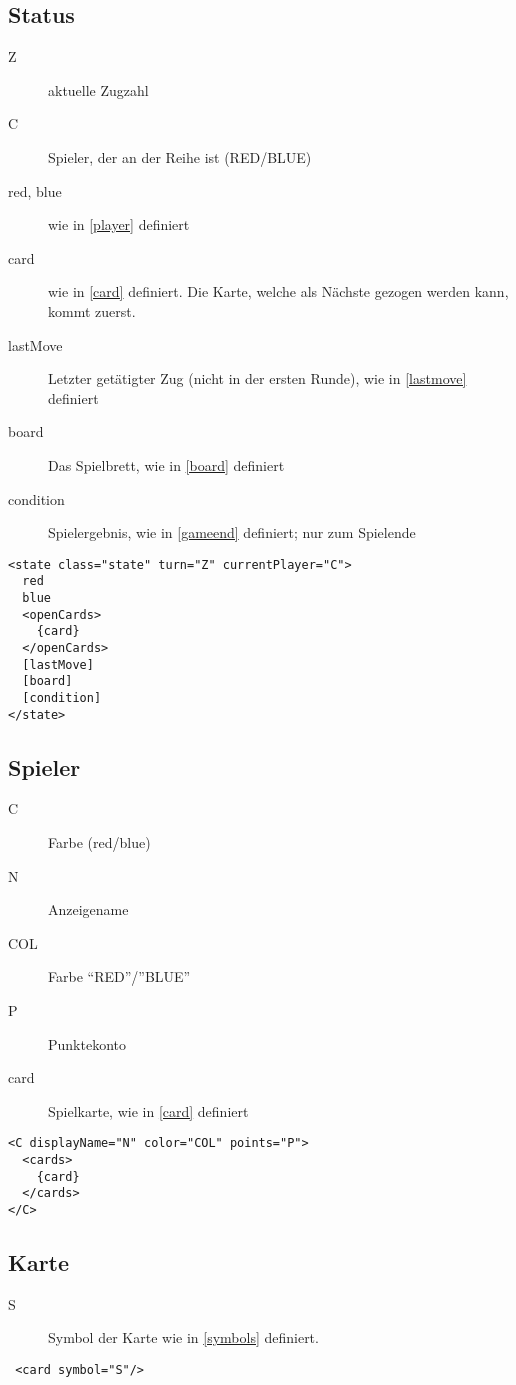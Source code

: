 \documentclass[12pt,a4paper, ngerman, oneside]{scrartcl}
\begin{document}
\subsection{\label{state}Status}
\begin{description}
\item[Z] aktuelle Zugzahl
\item[C] Spieler, der an der Reihe ist (RED/BLUE)
\item[red, blue] wie in \ref{player} definiert
\item[card] wie in \ref{card} definiert. Die Karte, welche als Nächste gezogen
werden kann, kommt zuerst.
\item[lastMove] Letzter getätigter Zug (nicht in der ersten Runde), wie in
\ref{lastmove} definiert
\item[board] Das Spielbrett, wie in \ref{board} definiert
\item[condition] Spielergebnis, wie in \ref{gameend} definiert; nur zum Spielende
\end{description}
\begin{verbatim}
<state class="state" turn="Z" currentPlayer="C">
  red
  blue
  <openCards>
    {card}
  </openCards>
  [lastMove]
  [board]
  [condition]
</state>

\end{verbatim}

\subsection{\label{player}Spieler}
\begin{description}
\item[C] Farbe (red/blue)
\item[N] Anzeigename
\item[COL] Farbe ``RED''/''BLUE''
\item[P] Punktekonto
\item[card] Spielkarte, wie in \ref{card} definiert
\end{description}
\begin{verbatim}
<C displayName="N" color="COL" points="P">
  <cards>
    {card}
  </cards>
</C>
\end{verbatim}


\subsection{\label{card}Karte}
\begin{description}
\item[S] Symbol der Karte wie in \ref{symbols} definiert.
\end{description}
\begin{verbatim} <card symbol="S"/>
\end{verbatim}
\end{document}
